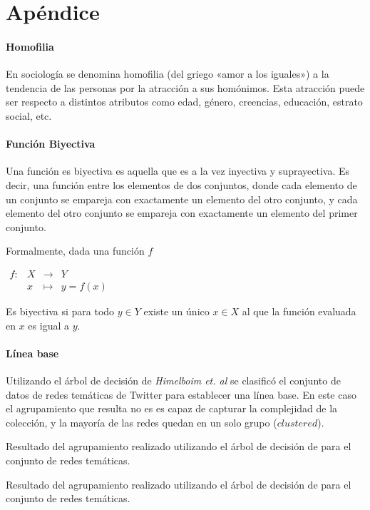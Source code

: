 
\chapter{Apéndice}
\label{chapter:appendix}

\subsubsection{Homofilia}

En sociología se denomina homofilia (del griego «amor a los iguales») a la tendencia de las personas por la atracción a sus homónimos. Esta atracción puede ser respecto a distintos atributos como edad, género, creencias, educación, estrato social, etc.

\subsubsection{Función Biyectiva}

Una función es biyectiva es aquella que es a la vez inyectiva y suprayectiva. Es decir, una función entre los elementos de dos conjuntos, donde cada elemento de un conjunto se empareja con exactamente un elemento del otro conjunto, y cada elemento del otro conjunto se empareja con exactamente un elemento del primer conjunto.

Formalmente, dada una función $f$

$ {\begin{array}{rccl}f:&X&\longrightarrow &Y\\&x&\longmapsto &y=f(x)\end{array}} $

Es biyectiva si para todo $y\in Y$ existe un único $x \in X$ al que la función evaluada en $x$ es igual a $y$.

\subsubsection{Línea base}
\label{sec:appendix:baseline}

Utilizando el árbol de decisión de \textit{Himelboim et. al} \cite{himelboim_classifying_2017} se clasificó el conjunto de datos de redes temáticas de Twitter para establecer una línea base. En este caso el agrupamiento que resulta no es es capaz de capturar la complejidad de la colección, y la mayoría de las redes quedan en un solo grupo ($clustered$).

\begin{table}[h]
\begin{center}
    \caption{Resultado del agrupamiento realizado utilizando el árbol de decisión de \cite{himelboim_classifying_2017} para el conjunto de redes temáticas.}
\end{center}
\end{table}

\begin{table}[h]
\begin{center}
    \caption{Resultado del agrupamiento realizado utilizando el árbol de decisión de \cite{himelboim_classifying_2017} para el conjunto de redes temáticas.}
\end{center}
\end{table}